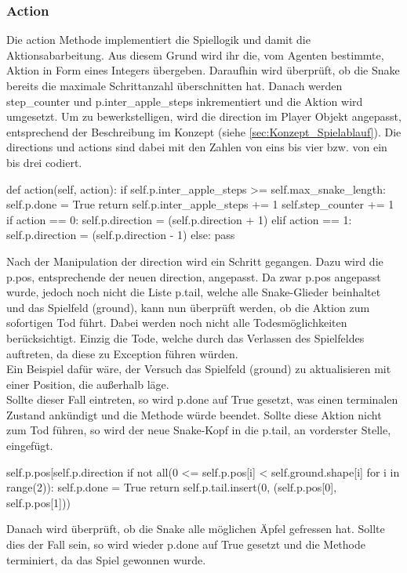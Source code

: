 \subsubsection{Action} \label{sec:Implementierung-Action}
Die action Methode implementiert die Spiellogik und damit die Aktionsabarbeitung. Aus diesem Grund wird ihr die, vom Agenten bestimmte, Aktion in Form eines Integers übergeben. Daraufhin wird überprüft, ob die Snake bereits die maximale Schrittanzahl überschnitten hat. Danach werden step\_counter und p.inter\_apple\_steps inkrementiert und die Aktion wird umgesetzt. Um zu bewerkstelligen, wird die direction im Player Objekt angepasst, entsprechend der Beschreibung im Konzept (siehe \ref{sec:Konzept_Spielablauf}). Die directions und actions sind dabei mit den Zahlen von eins bis vier bzw. von ein bis drei codiert.
\begin{python}
	def action(self, action):
		if self.p.inter_apple_steps >= self.max_snake_length:
			self.p.done = True
			return
		self.p.inter_apple_steps += 1
		self.step_counter += 1
		if action == 0:
			self.p.direction = (self.p.direction + 1) %
		elif action == 1:
			self.p.direction = (self.p.direction - 1) %
		else:
			pass
\end{python}
Nach der Manipulation der direction wird ein Schritt gegangen. Dazu wird die p.pos, entsprechende der neuen direction, angepasst. Da zwar p.pos angepasst wurde, jedoch noch nicht die Liste p.tail, welche alle Snake-Glieder beinhaltet und das Spielfeld (ground), kann nun überprüft werden, ob die Aktion zum sofortigen Tod führt. Dabei werden noch nicht alle Todesmöglichkeiten berücksichtigt. Einzig die Tode, welche durch das Verlassen des Spielfeldes auftreten, da diese zu Exception führen würden.\\ 
Ein Beispiel dafür wäre, der Versuch das Spielfeld (ground) zu aktualisieren mit einer Position, die außerhalb läge.\\
Sollte dieser Fall eintreten, so wird p.done auf True gesetzt, was einen terminalen Zustand ankündigt und die Methode würde beendet. Sollte diese Aktion nicht zum Tod führen, so wird der neue Snake-Kopf in die p.tail, an vorderster Stelle, eingefügt.
\begin{python}
	self.p.pos[self.p.direction %
	if not all(0 <= self.p.pos[i] < self.ground.shape[i] for i in range(2)):
		self.p.done = True
		return
	self.p.tail.insert(0, (self.p.pos[0], self.p.pos[1]))
\end{python}
Danach wird überprüft, ob die Snake alle möglichen Äpfel gefressen hat.  Sollte dies der Fall sein, so wird wieder p.done auf True gesetzt und die Methode terminiert, da das Spiel gewonnen wurde.
